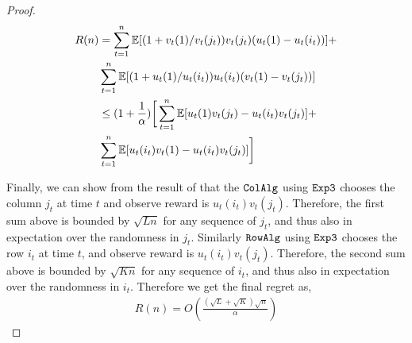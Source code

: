 \begin{proof}
\begin{align*}
R(n)
& = \sum_{t = 1}^n \mathbb{E}[{(1 + v_t(1) / v_t(j_t)) v_t(j_t) (u_t(1) - u_t(i_t))}] +\\
&\sum_{t = 1}^n \mathbb{E}[{(1 + u_t(1) / u_t(i_t)) u_t(i_t) (v_t(1) - v_t(j_t))}] \\
& \leq (1 + \frac{1}{\alpha}) \bigg[\sum_{t = 1}^n \mathbb{E}[{u_t(1) v_t(j_t) - u_t(i_t) v_t(j_t)}] + \\
& \sum_{t = 1}^n \mathbb{E}[{u_t(i_t) v_t(1) - u_t(i_t) v_t(j_t)}]\bigg]
\end{align*}


Finally, we can show from the result of \citet{auer2002nonstochastic} that the ${\tt ColAlg}$ using ${\tt Exp3}$ chooses the column $j_t$ at time $t$ and observe reward is $u_t(i_t) v_t(j_t)$. Therefore, the first sum above is bounded by $\sqrt{L n}$ for any sequence of $j_t$, and thus also in expectation over the randomness in $j_t$. Similarly ${\tt RowAlg}$ using ${\tt Exp3}$ chooses the row $i_t$ at time $t$, and observe reward is $u_t(i_t) v_t(j_t)$. Therefore, the second sum above is bounded by $\sqrt{K n}$ for any sequence of $i_t$, and thus also in expectation over the randomness in $i_t$. Therefore we get the final regret as,
\begin{align*}
  R(n) = O\left(\frac{\left(\sqrt{L } + \sqrt{K }\right)\sqrt{n}}{\alpha}\right)
\end{align*}
\end{proof}





